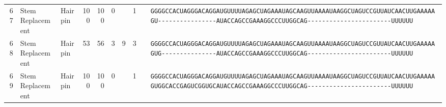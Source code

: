 \begin{tabular}{rllrrrrrcl}
\midrule

 67 & Stem Replacement & Hairpin & 100 & 100 & 0 &  & 1 &  &
 \color{ucsfdarkgrey}\verb|GGGGCCACUAGGGACAGGAU|\color{ucsforange}\verb|GUUUUA|\color{ucsfblue}\verb|GAGCUAGAAAUAGCAAGU|\color{ucsforange}\verb|UAAAAUAA|\color{ucsfnavy}\verb|GGCUAGUCC|\color{ucsforange}\verb|GUUAUCA|\color{ucsfteal}\verb|ACUUGAAAAAGU-|\color{ucsforange}\verb|---------------|\color{ucsfpurple}\verb|AUACCAGCCGAAAGGCCCUUGGCAG|\color{ucsforange}\verb|-----------------------UUUUUU| \\
                                                                                                                                                                                                                   
 68 & Stem Replacement & Hairpin & 53 & 56 & 3 & 9 & 3 &  &                                                                                                                                                        
 \color{ucsfdarkgrey}\verb|GGGGCCACUAGGGACAGGAU|\color{ucsforange}\verb|GUUUUA|\color{ucsfblue}\verb|GAGCUAGAAAUAGCAAGU|\color{ucsforange}\verb|UAAAAUAA|\color{ucsfnavy}\verb|GGCUAGUCC|\color{ucsforange}\verb|GUUAUCA|\color{ucsfteal}\verb|ACUUGAAAAAGUG|\color{ucsforange}\verb|---------------|\color{ucsfpurple}\verb|AUACCAGCCGAAAGGCCCUUGGCAG|\color{ucsforange}\verb|-----------------------UUUUUU| \\
                                                                                                                                                                                                                   
 69 & Stem Replacement & Hairpin & 100 & 100 & 0 &  & 1 &  &                                                                                                                                                       
 \color{ucsfdarkgrey}\verb|GGGGCCACUAGGGACAGGAU|\color{ucsforange}\verb|GUUUUA|\color{ucsfblue}\verb|GAGCUAGAAAUAGCAAGU|\color{ucsforange}\verb|UAAAAUAA|\color{ucsfnavy}\verb|GGCUAGUCC|\color{ucsforange}\verb|GUUAUCA|\color{ucsfteal}\verb|ACUUGAAAAAGU|\color{ucsforange}\verb|GGCACCGAGUCGGUGC|\color{ucsfpurple}\verb|AUACCAGCCGAAAGGCCCUUGGCAG|\color{ucsforange}\verb|-----------------------UUUUUU| \\
                                                                                                                                                                                                                   

\end{tabular}
